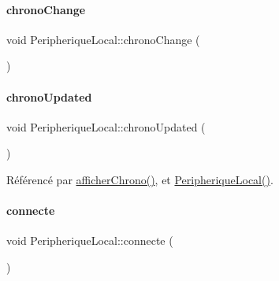 \mbox{\label{class_peripherique_local_ae2560469bb9aa4597b9064f159d3956d}} 
\paragraph{\texorpdfstring{chrono\+Change}{chronoChange}}
{\footnotesize\ttfamily void Peripherique\+Local\+::chrono\+Change (\begin{DoxyParamCaption}{ }\end{DoxyParamCaption})\hspace{0.3cm}{\ttfamily [signal]}}

\mbox{\label{class_peripherique_local_a8900d04b38a366bf786d608a741d2dc0}} 
\paragraph{\texorpdfstring{chrono\+Updated}{chronoUpdated}}
{\footnotesize\ttfamily void Peripherique\+Local\+::chrono\+Updated (\begin{DoxyParamCaption}{ }\end{DoxyParamCaption})\hspace{0.3cm}{\ttfamily [signal]}}



Référencé par \hyperlink{class_peripherique_local_af567be15ff8eb2a00cb4e0674ebf3004}{afficher\+Chrono()}, et \hyperlink{class_peripherique_local_a99a652b8659a3692f164cf1a0382e4bf}{Peripherique\+Local()}.

\mbox{\label{class_peripherique_local_a7495daea266cb24dec35d85c651bd4c5}} 
\paragraph{\texorpdfstring{connecte}{connecte}}
{\footnotesize\ttfamily void Peripherique\+Local\+::connecte (\begin{DoxyParamCaption}{ }\end{DoxyParamCaption})\hspace{0.3cm}{\ttfamily [signal]}}



